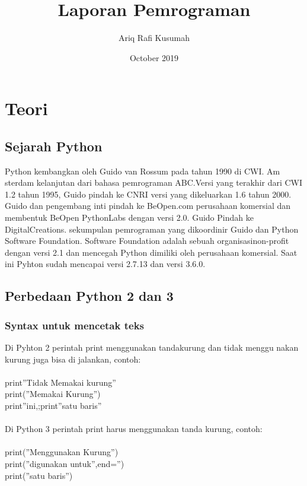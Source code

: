 \documentclass[12pt, times new roman, a4paper]{article}
\title{Laporan Pemrograman}
\author{Ariq Rafi Kusumah}
\date{October 2019}
\begin{document}
\maketitle

\section{Teori}
\subsection{Sejarah Python}
	Python kembangkan oleh Guido van Rossum pada tahun 1990 di CWI. Am
sterdam kelanjutan dari bahasa pemrograman ABC.Versi yang terakhir dari
CWI 1.2 tahun 1995, Guido pindah ke CNRI versi yang dikeluarkan 1.6 tahun 2000. Guido dan pengembang inti pindah ke BeOpen.com perusahaan
komersial dan membentuk BeOpen PythonLabs dengan versi 2.0. Guido Pindah ke DigitalCreations. sekumpulan pemrograman yang dikoordinir Guido dan Python Software Foundation. Software Foundation adalah sebuah organisasinon-proﬁt dengan versi 2.1 dan mencegah Python dimiliki oleh perusahaan komersial. Saat ini Pyhton sudah mencapai versi 2.7.13 dan versi 3.6.0.
\subsection{Perbedaan Python 2 dan 3}
\subsubsection{Syntax untuk mencetak teks}
Di Pyhton 2 perintah print menggunakan tandakurung dan tidak menggu
nakan kurung juga bisa di jalankan, contoh:\\
\\
print”Tidak Memakai kurung”\\
print(”Memakai Kurung”)\\
print”ini,;print”satu baris”\\
\\
Di Python 3 perintah print harus menggunakan tanda kurung, contoh:\\
\\
print(”Menggunakan Kurung”)\\
print(”digunakan untuk”,end=”)\\
print(”satu baris”)\\
\\
\end{document}
